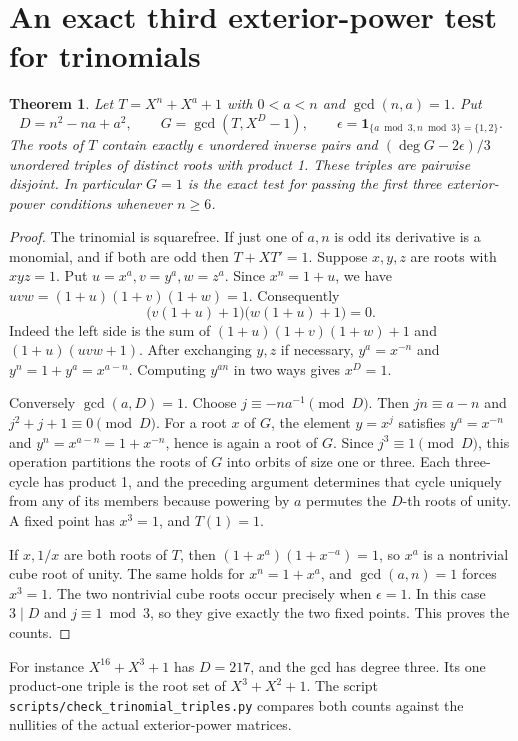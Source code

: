\documentclass[11pt]{article}
\newtheorem{theorem}{Theorem}
\begin{document}
\section{An exact third exterior-power test for trinomials}
\begin{theorem}\label{thm:triple-orbits}
Let \(T=X^n+X^a+1\) with \(0<a<n\) and \(\gcd(n,a)=1\). Put
\[
       D=n^2-na+a^2,\qquad G=\gcd(T,X^D-1),\qquad
       \epsilon=\mathbf1_{\{a\bmod3,n\bmod3\}=\{1,2\}} .
\]
The roots of \(T\) contain exactly \(\epsilon\) unordered inverse
pairs and \((\deg G-2\epsilon)/3\) unordered triples of distinct roots
with product 1. These triples are pairwise disjoint. In particular
\(G=1\) is the exact test for passing the first three exterior-power
conditions whenever \(n\ge6\).
\end{theorem}
\begin{proof}
The trinomial is squarefree. If just one of \(a,n\) is odd its
derivative is a monomial, and if both are odd then \(T+XT'=1\).
Suppose \(x,y,z\) are roots with \(xyz=1\). Put \(u=x^a,v=y^a,w=z^a\).
Since \(x^n=1+u\), we have \(uvw=(1+u)(1+v)(1+w)=1\). Consequently
\[
             \bigl(v(1+u)+1\bigr)\bigl(w(1+u)+1\bigr)=0 .
\]
Indeed the left side is the sum of \((1+u)(1+v)(1+w)+1\) and
\((1+u)(uvw+1)\). After exchanging \(y,z\) if necessary,
\(y^a=x^{-n}\) and \(y^n=1+y^a=x^{a-n}\).
Computing \(y^{an}\) in two ways gives \(x^D=1\).

Conversely \(\gcd(a,D)=1\). Choose \(j\equiv-na^{-1}\pmod D\).
Then \(jn\equiv a-n\) and \(j^2+j+1\equiv0\pmod D\).
For a root \(x\) of \(G\), the element \(y=x^j\) satisfies
\(y^a=x^{-n}\) and \(y^n=x^{a-n}=1+x^{-n}\), hence is again a root
of \(G\). Since \(j^3\equiv1\pmod D\), this operation partitions the
roots of \(G\) into orbits of size one or three. Each three-cycle has
product 1, and the preceding argument determines that cycle uniquely
from any of its members because powering by \(a\) permutes the
\(D\)-th roots of unity. A fixed point has \(x^3=1\), and \(T(1)=1\).

If \(x,1/x\) are both roots of \(T\), then
\((1+x^a)(1+x^{-a})=1\), so \(x^a\) is a nontrivial cube root of
unity. The same holds for \(x^n=1+x^a\), and \(\gcd(a,n)=1\)
forces \(x^3=1\). The two nontrivial cube roots occur precisely
when \(\epsilon=1\). In this case \(3\mid D\) and \(j\equiv1\bmod3\),
so they give exactly the two fixed points. This proves the counts.
\end{proof}
For instance \(X^{16}+X^3+1\) has \(D=217\), and the gcd has degree
three. Its one product-one triple is the root set of \(X^3+X^2+1\).
The script \texttt{scripts/check\_trinomial\_triples.py} compares both
counts against the nullities of the actual exterior-power matrices.
\end{document}
